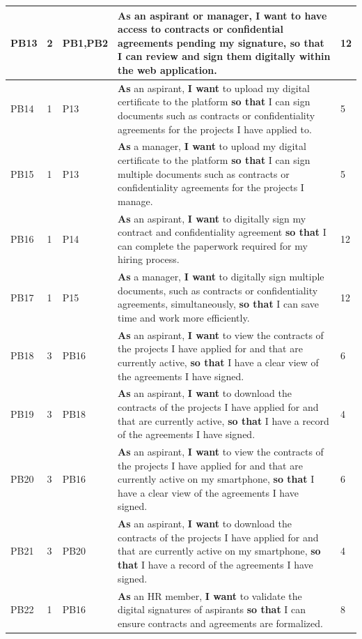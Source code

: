 \documentclass{scrreprt}
\begin{document}
\begin{longtable}{|p{0.8cm}|p{1.5cm}|p{2.5cm}|p{8cm}|p{2cm}|}
	PB13 & 2 & PB1,PB2 & \textbf{As} an aspirant or manager, \textbf{I want} to have access to contracts or confidential agreements pending my signature, \textbf{so that} I can review and sign them digitally within the web application. & 12 \\ \hline
	PB14 & 1 & P13 & \textbf{As} an aspirant, \textbf{I want} to upload my digital certificate to the platform \textbf{so that} I can sign documents such as contracts or confidentiality agreements for the projects I have applied to. & 5 \\ \hline
	PB15 & 1 & P13 & \textbf{As} a manager, \textbf{I want} to upload my digital certificate to the platform \textbf{so that} I can sign multiple documents such as contracts or confidentiality agreements for the projects I manage. & 5 \\ \hline
	PB16 & 1 & P14 & \textbf{As} an aspirant, \textbf{I want} to digitally sign my contract and confidentiality agreement \textbf{so that} I can complete the paperwork required for my hiring process. & 12 \\ \hline
	PB17 & 1 & P15 & \textbf{As} a manager, \textbf{I want} to digitally sign multiple documents, such as contracts or confidentiality agreements, simultaneously, \textbf{so that} I can save time and work more efficiently. & 12 \\ \hline
	PB18 & 3 & PB16 & \textbf{As} an aspirant, \textbf{I want} to view the contracts of the projects I have applied for and that are currently active, \textbf{so that} I have a clear view of the agreements I have signed. & 6 \\ \hline
	PB19 & 3 & PB18 & \textbf{As} an aspirant, \textbf{I want} to download the contracts of the projects I have applied for and that are currently active, \textbf{so that} I have a record of the agreements I have signed. & 4 \\ \hline
	PB20 & 3 & PB16 & \textbf{As} an aspirant, \textbf{I want} to view the contracts of the projects I have applied for and that are currently active on my smartphone, \textbf{so that} I have a clear view of the agreements I have signed. & 6 \\ \hline
	PB21 & 3 & PB20 & \textbf{As} an aspirant, \textbf{I want} to download the contracts of the projects I have applied for and that are currently active on my smartphone, \textbf{so that} I have a record of the agreements I have signed. & 4 \\ \hline
	PB22 & 1 & PB16 & \textbf{As} an HR member, \textbf{I want} to validate the digital signatures of aspirants \textbf{so that} I can ensure contracts and agreements are formalized. & 8 \\ \hline
	

\end{longtable}
\end{document}

